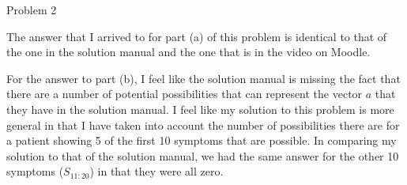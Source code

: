 \begin{problem}{Problem 2}
    \begin{Highlight}
        The answer that I arrived to for part (a) of this problem is identical to that of the one in the solution manual and the one that is in the video on Moodle.

        For the answer to part (b), I feel like the solution manual is missing the fact that there are a number of potential possibilities that can represent the vector $a$ that they have
        in the solution manual. I feel like my solution to this problem is more general in that I have taken into account the number of possibilities there are for a patient showing 5 of
        the first 10 symptoms that are possible. In comparing my solution to that of the solution manual, we had the same answer for the other 10 symptoms ($S_{11:20}$) in that they were
        all zero.
    \end{Highlight}
\end{problem}

